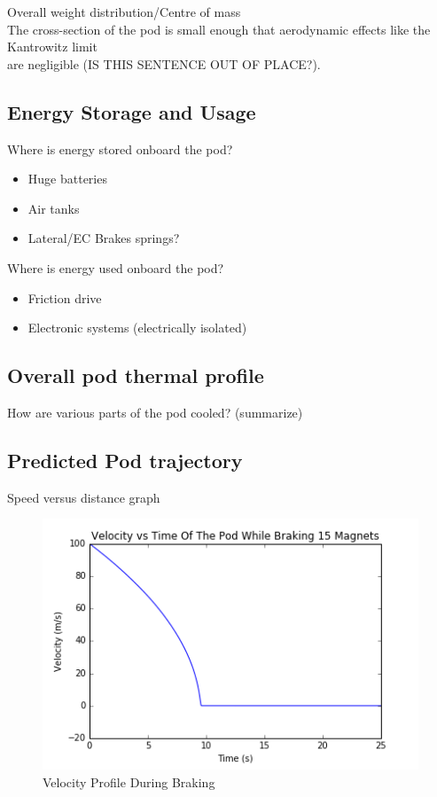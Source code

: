 \documentclass[main.tex]{subfiles}
\begin{document}
\begin{flushleft}
Overall weight distribution/Centre of mass\\
The cross-section of the pod is small enough that aerodynamic effects like the Kantrowitz limit\\
are negligible (IS THIS SENTENCE OUT OF PLACE?).\\

\subsection{Energy Storage and Usage}
Where is energy stored onboard the pod?
\begin{itemize}
    \item Huge batteries
    \item Air tanks
    \item Lateral/EC Brakes springs?
\end{itemize}
Where is energy used onboard the pod?
\begin{itemize}
    \item Friction drive
    \item Electronic systems (electrically isolated)
\end{itemize}

\subsection{Overall pod thermal profile}
How are various parts of the pod cooled? (summarize)

\subsection{Predicted Pod trajectory}
Speed versus distance graph
\begin{figure} [H]
        \centering
        \includegraphics[width=\linewidth]{images/velocity_time_graph}
        \caption{Velocity Profile During Braking}
        \label{fig:velocity-profile}
    \end{figure}
    

\end{flushleft}
\end{document}
